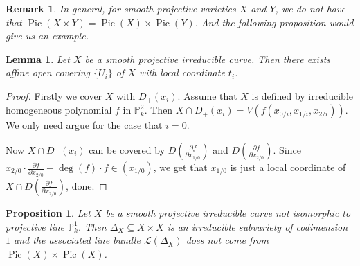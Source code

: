\documentclass{ctexart}
\newtheorem{remark}{Remark}[section]
\newtheorem{proposition}{Proposition}[section]
\newtheorem{lemma}{Lemma}[section]
\newcommand{\picardscheme}{\operatorname{Pic}}
\begin{document}
\begin{remark}
    In general, for smooth projective varieties $X$ and $Y$, 
    we do not have that $\picardscheme (X \times Y) = \picardscheme (X) \times \picardscheme (Y)$.
    And the following proposition would give us an example.
\end{remark}
\begin{lemma}
    Let $X$ be a smooth projective irreducible curve.
    Then there exists affine open covering $\{U_{i}\}$ of $X$ with local coordinate $t_{i}$.
    \label{Lemma 7.6}
\end{lemma}
\begin{proof}
    Firstly we cover $X$ with $D_{+}(x_{i})$.
    Assume that $X$ is defined by irreducible homogeneous polynomial $f$ in $\mathbb{P}_{k}^{2}$.
    Then $X \cap D_{+}(x_{i}) = V(f(x_{0/i}, x_{1/i}, x_{2/i}))$.
    We only need argue for the case that $i = 0$.
    \par
    Now $X \cap D_{+}(x_{i})$ can be covered by $D(\frac{\partial f}{\partial x_{1/0}})$ and $D(\frac{\partial f}{\partial x_{2/0}})$.
    Since $x_{2/0} \cdot \frac{\partial f}{\partial x_{2/0}} - \deg (f) \cdot f\in (x_{1/0})$, we get that $x_{1/0}$ is just a local coordinate of $X \cap D(\frac{\partial f}{\partial x_{2/0}})$, done.
\end{proof}
\begin{proposition}
    Let $X$ be a smooth projective irreducible curve not isomorphic to projective line $\mathbb{P}_{k}^{1}$.
    Then $\Delta_{X} \subseteq X \times X$ is an irreducible subvariety of codimension $1$ and the associated line bundle $\mathcal{L}(\Delta_{X})$ does not come from $\picardscheme (X) \times \picardscheme (X)$.
    \label{Proposition 7.3}
\end{proposition}
\end{document}
